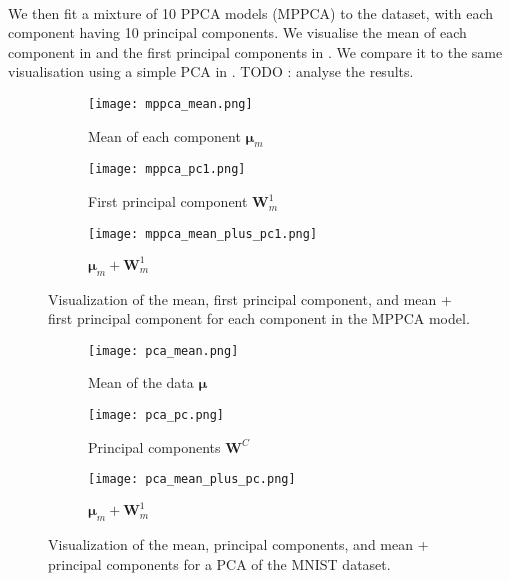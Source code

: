 \documentclass{article}
\begin{document}
\paragraph{} We then fit a mixture of 10 PPCA models (MPPCA) to the dataset, with each component having 10 principal components. We visualise the mean of each component in  and the first principal components in . We compare it to the same visualisation using a simple PCA in . TODO : analyse the results. 

\begin{figure}[H]
    \centering
    \begin{subfigure}[b]{0.1\textwidth}
        \centering
        \texttt{[image: mppca\_mean.png]}
        \caption{Mean of each component $\boldsymbol{\mu}_m$}
        \label{fig:mppca_mnist_mean}
    \end{subfigure}
    \hfill
    \begin{subfigure}[b]{0.1\textwidth}
        \centering
        \texttt{[image: mppca\_pc1.png]}
        \caption{First principal component $\mathbf{W}_m^1$}
        \label{fig:mppca_mnist_pc1}
    \end{subfigure}
    \hfill
    \begin{subfigure}[b]{0.1\textwidth}
        \centering
        \texttt{[image: mppca\_mean\_plus\_pc1.png]}
        \caption{$\boldsymbol{\mu}_m + \mathbf{W}_m^1$}
        \label{fig:mppca_mnist_mean_plus_pc1}
    \end{subfigure}
    \caption{Visualization of the mean, first principal component, and mean + first principal component for each component in the MPPCA model.}
    \label{fig:mppca_mnist}
\end{figure}

\begin{figure}[H]
    \centering
    \begin{subfigure}[b]{0.1\textwidth}
        \centering
        \texttt{[image: pca\_mean.png]}
        \caption{Mean of the data $\boldsymbol{\mu}$}
        \label{fig:pca_mnist_mean}
    \end{subfigure}
    \hfill
    \begin{subfigure}[b]{0.1\textwidth}
        \centering
        \texttt{[image: pca\_pc.png]}
        \caption{Principal components $\mathbf{W}^C$}
        \label{fig:pca_mnist_pc}
    \end{subfigure}
    \hfill
    \begin{subfigure}[b]{0.1\textwidth}
        \centering
        \texttt{[image: pca\_mean\_plus\_pc.png]}
        \caption{$\boldsymbol{\mu}_m + \mathbf{W}_m^1$}
        \label{fig:pca_mnist_mean_plus_pc}
    \end{subfigure}
    \caption{Visualization of the mean, principal components, and mean + principal components for a PCA of the MNIST dataset.}
    \label{fig:mppca_mnist}
\end{figure}
\end{document}
